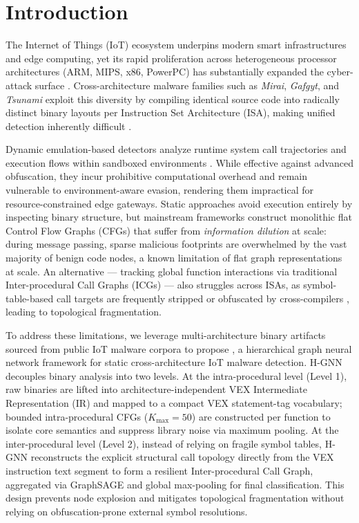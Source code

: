 \documentclass{llncs}
\begin{document}
\section{Introduction}
\label{sec:introduction}

The Internet of Things (IoT) ecosystem underpins modern smart
infrastructures and edge computing, yet its rapid proliferation
across heterogeneous processor architectures (ARM, MIPS, x86,
PowerPC) has substantially expanded the cyber-attack surface
\cite{b2}. Cross-architecture malware families such as
\textit{Mirai}, \textit{Gafgyt}, and \textit{Tsunami} exploit
this diversity by compiling identical source code into radically
distinct binary layouts per Instruction Set Architecture (ISA),
making unified detection inherently difficult \cite{b1}.

Dynamic emulation-based detectors analyze runtime system call
trajectories and execution flows within sandboxed environments
\cite{b3}. While effective against advanced obfuscation,
they incur prohibitive computational overhead and remain
vulnerable to environment-aware evasion, rendering them
impractical for resource-constrained edge gateways. Static
approaches avoid execution entirely by inspecting binary
structure, but mainstream frameworks construct monolithic flat
Control Flow Graphs (CFGs) that suffer from \textit{information
dilution} at scale: during message passing, sparse malicious
footprints are overwhelmed by the vast majority of benign code
nodes, a known limitation of flat graph representations at scale.
An alternative — tracking global function interactions via traditional 
Inter-procedural Call Graphs (ICGs) — also struggles across ISAs, as symbol-table-based 
call targets are frequently stripped or obfuscated by cross-compilers \cite{b4}, 
leading to topological fragmentation.

To address these limitations, we leverage multi-architecture binary 
artifacts sourced from public IoT malware corpora to propose , a
hierarchical graph neural network framework for static
cross-architecture IoT malware detection. H-GNN
decouples binary analysis into two levels. At the
intra-procedural level (Level 1), raw binaries are lifted into
architecture-independent VEX Intermediate Representation (IR)
and mapped to a compact VEX statement-tag vocabulary; bounded intra-procedural
CFGs ($K_{\max} = 50$) are constructed per function to isolate
core semantics and suppress library noise via maximum pooling. At the
inter-procedural level (Level 2), instead of relying on fragile symbol tables, 
H-GNN reconstructs the explicit structural call topology directly from 
the VEX instruction text segment to form a resilient Inter-procedural Call Graph, 
aggregated via GraphSAGE and global max-pooling for final classification. 
This design prevents node explosion and mitigates topological fragmentation without 
relying on obfuscation-prone external symbol resolutions.
\end{document}
